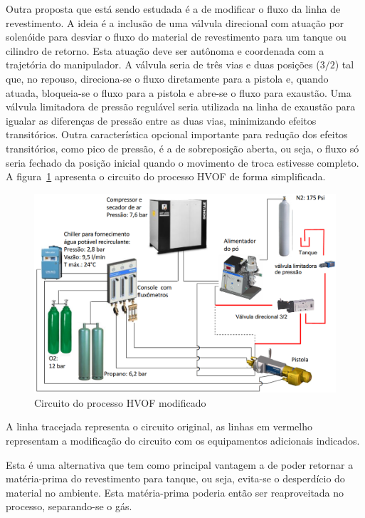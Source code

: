 Outra proposta que está sendo estudada é a de modificar o fluxo da linha de
revestimento. A ideia é a inclusão de uma válvula direcional com atuação por
solenóide para desviar o fluxo do material de revestimento para um tanque ou
cilindro de retorno. Esta atuação deve ser autônoma e coordenada com a
trajetória do manipulador. A válvula seria de três vias e duas posições ($3/2$) tal que, no 
repouso, direciona-se o fluxo diretamente para a pistola e, quando
atuada, bloqueia-se o fluxo para a pistola e abre-se o fluxo para exaustão. Uma
válvula limitadora de pressão regulável seria utilizada na linha de exaustão
para igualar as diferenças de pressão entre as duas vias, minimizando efeitos
transitórios.
Outra característica opcional importante para redução dos efeitos transitórios,
como pico de pressão, é a de sobreposição aberta, ou seja, o fluxo só seria
fechado da posição inicial quando o movimento de troca estivesse completo. 
A figura~\ref{fig::circuito_hvof} apresenta o circuito do processo HVOF de forma
simplificada.

 \begin{figure}[h!]
   \centering
   \includegraphics[width=0.8\columnwidth]{figs/shutter/Circuito_HVOF_mod}
   \caption{Circuito do processo HVOF modificado}
   \label{fig::circuito_hvof}
\end{figure}

A linha tracejada representa o circuito original, as linhas em vermelho
representam a modificação do circuito com os equipamentos adicionais indicados.

Esta é uma alternativa que tem como principal vantagem a de poder retornar a
matéria-prima do revestimento para tanque, ou seja, evita-se
o desperdício do material no ambiente. Esta matéria-prima poderia então ser
reaproveitada no processo, separando-se o gás.
